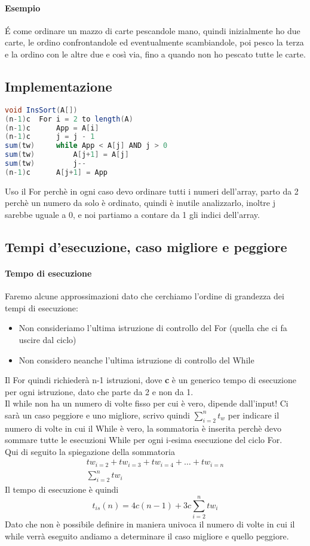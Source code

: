 \paragraph*{Esempio} \'E come ordinare un mazzo di carte pescandole mano, quindi inizialmente ho due
carte, le ordino confrontandole ed eventualmente scambiandole, poi pesco la terza e la ordino
con le altre due e così via, fino a quando non ho pescato tutte le carte.
\subsection{Implementazione}
\begin{lstlisting}[language=Java]
    void InsSort(A[])
(n-1)c  For i = 2 to length(A)
(n-1)c      App = A[i]
(n-1)c      j = j - 1
sum(tw)     while App < A[j] AND j > 0
sum(tw)         A[j+1] = A[j]
sum(tw)         j--
(n-1)c      A[j+1] = App
\end{lstlisting}
Uso il For perchè in ogni caso devo ordinare tutti i numeri dell'array, parto da
2 perchè un numero da solo è ordinato, quindi è inutile analizzarlo, inoltre j sarebbe uguale a 0,
e noi partiamo a contare da 1 gli indici dell'array.\\
\subsection{Tempi d'esecuzione, caso migliore e peggiore}
\paragraph*{Tempo di esecuzione} Faremo alcune approssimazioni dato che cerchiamo l'ordine
di grandezza dei tempi di esecuzione:
\begin{itemize}
    \item Non consideriamo l'ultima istruzione di controllo del For (quella che ci fa uscire dal ciclo)
    \item Non considero neanche l'ultima istruzione di controllo del While
\end{itemize}
Il For quindi richiederà n-1 istruzioni, dove \textbf{c} è un generico tempo di esecuzione per ogni istruzione,
dato che parte da 2 e non da 1.\\
Il while non ha un numero di volte fisso per cui è vero, dipende dall'input! Ci sarà un caso
peggiore e uno migliore, scrivo quindi $\sum_{i=2}^n{t_w}$ per indicare il numero di volte in cui il While è vero, 
la sommatoria è inserita perchè devo sommare tutte le esecuzioni While per ogni i-esima esecuzione 
del ciclo For.\\
Qui di seguito la spiegazione della sommatoria
\begin{align*}
    tw_{i=2} + tw_{i=3} + tw_{i=4} + \dots + tw_{i=n} \\
    \sum_{i=2}^n{tw_i}
\end{align*}
Il tempo di esecuzione è quindi
\begin{equation*}
    t_{is}(n) = 4c(n-1)+3c \sum_{i=2}^n tw_i
\end{equation*}
Dato che non è possibile definire in maniera univoca il numero di volte in cui
il while verrà eseguito andiamo a determinare il caso migliore e quello peggiore.
